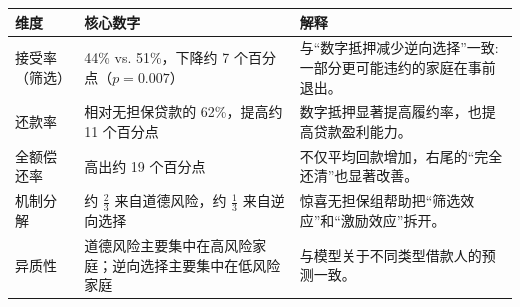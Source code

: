 \begin{table}
  \centering
  \scriptsize
  \begin{tabular}{p{3.1cm} p{2.6cm} p{5.6cm}}
    \toprule
    \textbf{维度} & \textbf{核心数字} & \textbf{解释} \\
    \midrule
    接受率（筛选） & 44\% vs. 51\%，下降约 7 个百分点（$p=0.007$） & 与“数字抵押减少逆向选择”一致: 一部分更可能违约的家庭在事前退出。 \\
    还款率 & 相对无担保贷款的 62\%，提高约 11 个百分点 & 数字抵押显著提高履约率，也提高贷款盈利能力。 \\
    全额偿还率 & 高出约 19 个百分点 & 不仅平均回款增加，右尾的“完全还清”也显著改善。 \\
    机制分解 & 约 $\frac{2}{3}$ 来自道德风险，约 $\frac{1}{3}$ 来自逆向选择 & 惊喜无担保组帮助把“筛选效应”和“激励效应”拆开。 \\
    异质性 & 道德风险主要集中在高风险家庭；逆向选择主要集中在低风险家庭 & 与模型关于不同类型借款人的预测一致。 \\
    \bottomrule
  \end{tabular}
\end{table}
